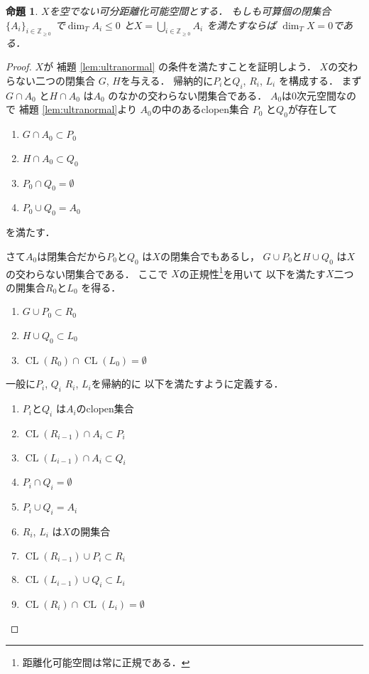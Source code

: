 \documentclass[leqno, a4paper, 12pt]{jsarticle}
\newtheorem{prop}[thm]{命題}
\newcommand{\zz}{\mathbb{Z}}
\DeclareMathOperator{\cl}{CL}
\begin{document}
\begin{prop}\label{prop:sumn=0}
$X$を空でない可分距離化可能空間とする．
もしも可算個の閉集合$\{A_{i}\}_{i\in \zz_{\ge 0}}$
で$\dim_{T}A_{i}\le 0$
と$X=\bigcup_{i\in \zz_{\ge 0}}A_{i}$
を満たすならば
$\dim_{T} X= 0$である．
\end{prop}
\begin{proof}
$X$が
補題 \ref{lem:ultranormal}
の条件を満たすことを証明しよう．
$X$の交わらない二つの閉集合
$G$, $H$を与える．
帰納的に$P_{i}$と$Q_{i}$, $R_{i}$, $L_{i}$
を構成する．
まず
$G\cap A_{0}$
と$H\cap A_{0}$
は$A_{0}$
のなかの交わらない閉集合である．
$A_{0}$は$0$次元空間なので
補題 \ref{lem:ultranormal}より
$A_{0}$の中のあるclopen集合
$P_{0}$
と$Q_{0}$が存在して
\begin{enumerate}
\item $G\cap A_{0}\subset P_{0}$
\item $H\cap A_{0}\subset Q_{0}$
\item $P_{0}\cap Q_{0}=\emptyset$
\item $P_{0}\cup Q_{0}=A_{0}$
\end{enumerate}
を満たす．

さて$A_{0}$は閉集合だから$P_{0}$と$Q_{0}$
は$X$の閉集合でもあるし，
$G\cup P_{0}$と$H\cup Q_{0}$
は$X$の交わらない閉集合である．
ここで
$X$の正規性\footnote{距離化可能空間は常に正規である．}を用いて
以下を満たす$X$二つの開集合$R_{0}$と$L_{0}$
を得る．
\begin{enumerate}
\item $G\cup P_{0}\subset R_{0}$
\item $H\cup Q_{0}\subset L_{0}$
\item $\cl (R_{0})\cap \cl(L_{0})=\emptyset$
\end{enumerate}

一般に$P_{i}$, $Q_{i}$
$R_{i}$, $L_{i}$を帰納的に
以下を満たすように定義する．
\begin{enumerate}
\item $P_{i}$と$Q_{i}$
は$A_{i}$のclopen集合
\item 
$\cl(R_{i-1})\cap A_{i}\subset P_{i}$
\item 
$\cl(L_{i-1})\cap A_{i}\subset Q_{i}$
\item 
$P_{i}\cap Q_{i}=\emptyset$
\item $P_{i}\cup Q_{i}=A_{i}$
\item $R_{i}$, $L_{i}$
は$X$の開集合
\item 
$\cl(R_{i-1})\cup P_{i}\subset R_{i}$

\item 
$\cl(L_{i-1})\cup Q_{i}\subset L_{i}$
\item 
$\cl(R_{i})\cap \cl(L_{i})=\emptyset$


\end{enumerate}
\end{proof}
\end{document}
